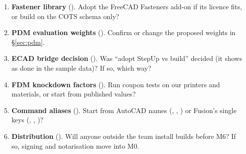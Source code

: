 \begin{enumerate}[label=Q\arabic*.,ref=Q\arabic*]
  \item \textbf{Fastener library} (). Adopt the FreeCAD Fasteners add-on if its licence fits, or
        build on the COTS schema only?
  \item \textbf{PDM evaluation weights} (). Confirm or change the proposed weights in
        \S\ref{sec:pdm}.
  \item \textbf{ECAD bridge decision} (). Was ``adopt StepUp vs build'' decided (it shows as done in the
        sample data)? If so, which way?
  \item \textbf{FDM knockdown factors} (). Run coupon tests on our printers and materials, or start
        from published values?
  \item \textbf{Command aliases} (). Start from AutoCAD names (, , ) or
        Fusion's single keys (, , )?
  \item \textbf{Distribution} (). Will anyone outside the team install builds before M6? If so,
        signing and notarisation move into M0.
\end{enumerate}
